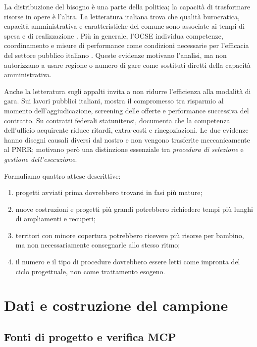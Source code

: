 \documentclass[10pt,a4paper]{article}
\begin{document}
La distribuzione del bisogno è una parte della politica; la capacità di trasformare risorse in opere è l'altra. La letteratura italiana trova che qualità burocratica, capacità amministrativa e caratteristiche del comune sono associate ai tempi di spesa e di realizzazione \citep{delmonte2025,cerqua2025}. Più in generale, l'OCSE individua competenze, coordinamento e misure di performance come condizioni necessarie per l'efficacia del settore pubblico italiano \citep{bulman2021}. Queste evidenze motivano l'analisi, ma non autorizzano a usare regione o numero di gare come sostituti diretti della capacità amministrativa.

Anche la letteratura sugli appalti invita a non ridurre l'efficienza alla modalità di gara. Sui lavori pubblici italiani, \citet{decarolis2014} mostra il compromesso tra risparmio al momento dell'aggiudicazione, screening delle offerte e performance successiva del contratto. Su contratti federali statunitensi, \citet{decarolis2020} documenta che la competenza dell'ufficio acquirente riduce ritardi, extra-costi e rinegoziazioni. Le due evidenze hanno disegni causali diversi dal nostro e non vengono trasferite meccanicamente al PNRR; motivano però una distinzione essenziale tra \emph{procedura di selezione} e \emph{gestione dell'esecuzione}.

Formuliamo quattro attese descrittive:

\begin{enumerate}
  \item progetti avviati prima dovrebbero trovarsi in fasi più mature;
  \item nuove costruzioni e progetti più grandi potrebbero richiedere tempi più lunghi di ampliamenti e recuperi;
  \item territori con minore copertura potrebbero ricevere più risorse per bambino, ma non necessariamente consegnarle allo stesso ritmo;
  \item il numero e il tipo di procedure dovrebbero essere letti come impronta del ciclo progettuale, non come trattamento esogeno.
\end{enumerate}

\section{Dati e costruzione del campione}

\subsection{Fonti di progetto e verifica MCP}
\end{document}
